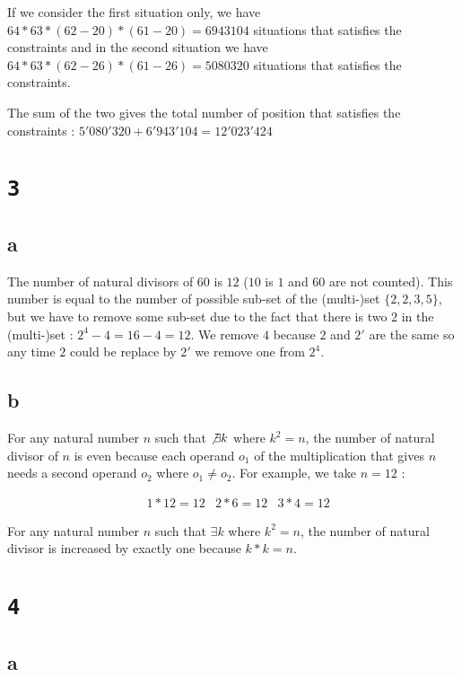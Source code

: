 \documentclass[a4paper,11pt]{report}
\begin{document}
If we consider the first situation only, we have $64 * 63 * (62 - 20) * (61 -
20) = 6943104$ situations that satisfies the constraints and in the second
situation we have $64 * 63 * (62 - 26) * (61 - 26) = 5080320$ situations that
satisfies the constraints.

The sum of the two gives the total number of position that satisfies the
constraints : $5'080'320 + 6'943'104 = 12'023'424$

\section*{\texttt{3}}
\subsection*{a}

The number of natural divisors of $60$ is $12$ ($10$ is $1$ and $60$ are not
counted). This number is equal to the number of possible sub-set of the
(multi-)set $\{2,2,3,5\}$, but we have to remove some sub-set due to the fact
that there is two $2$ in the (multi-)set : $2^4 - 4 = 16 - 4 = 12$. We remove
$4$ because $2$ and $2'$ are the same so any time $2$ could be replace by $2'$
we remove one from $2^4$.

\subsection*{b}

For any natural number $n$ such that $\not\exists k$ where $k^2 = n$, the number
of natural divisor of $n$ is even because each operand $o_1$ of the multiplication
that gives $n$ needs a second operand $o_2$ where $o_1 \neq o_2$. For example,
we take $n=12$ :

\begin{align*}
  &1 * 12 = 12
  &2 * 6 = 12
  &3 * 4 = 12
\end{align*}

For any natural number $n$ such that $\exists k$ where $k^2 = n$, the number of
natural divisor is increased by exactly one because $k * k = n$.

\section*{\texttt{4}}
\subsection*{a}
\end{document}
